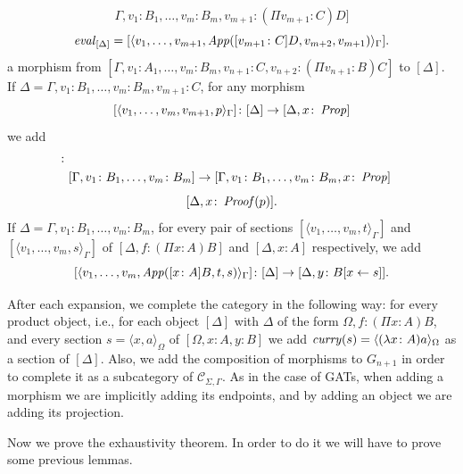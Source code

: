 \begin{enumerate}
\[                \Gamma,
                v_1 \colon B_1, \dots, v_m \colon B_m,
                v_{m+1} \colon (\Pi v_{m+1} \colon C) D
            ]
        \]
        \[
            \operatorname{\mathit{eval}}_{[\Delta]} = [ \langle
                v_1, \dots, v_{m+1},
                \operatorname{\mathit{App}}([v_{m+1} \colon C]D, v_{m+2}, v_{m+1})
            \rangle_\Gamma].
        \]
        a morphism from $[\Gamma, v_1 \colon A_1, \dots, v_m \colon B_m, v_{n+1} \colon C, v_{n+2} \colon (\Pi v_{n+1} \colon B)C ]$
        to $[\Delta]$.
        If $\Delta = \Gamma, v_1 \colon B_1, \dots, v_m \colon B_m, v_{m+1} \colon C$,
        for any morphism $$[\langle v_1, \dots, v_m, v_{m+1}, p \rangle_\Gamma] \colon [\Delta] \to [ \Delta, x \colon \operatorname{\mathit{Prop}}]$$
        we add \begin{align*}
            [ \langle v_1, \dots, v_m, &(\forall \colon v_{m+1} C)p \rangle_\Gamma] \colon \\ 
            &[\Gamma, v_1 \colon B_1, \dots, v_m \colon B_m]
            \to [ \Gamma, v_1 \colon B_1, \dots, v_m \colon B_m, x \colon \Prop]
        \end{align*}
        \[
            [\Delta, x \colon \operatorname{\mathit{Proof}}(p)].
        \]
        If $\Delta = \Gamma, v_1 \colon B_1, \dots, v_m \colon B_m$, 
        for every pair of sections $[\langle v_1, \dots, v_m, t \rangle_\Gamma]$ and \\ %
        $[\langle v_1, \dots, v_m, s \rangle_\Gamma]$
        of $[\Delta, f \colon (\Pi x \colon A) B]$ and $[\Delta, x \colon A]$ respectively,
        we add \[
            [\langle v_1, \dots, v_m, \operatorname{\mathit{App}}([x \colon A] B, t, s)\rangle_\Gamma]
            \colon [\Delta] \to [\Delta, y \colon B[x  \leftarrow  s]].
        \]
\end{enumerate}
After each expansion, we complete the category in the following way:
for every product object, i.e., for each object $[\Delta]$ with $\Delta$
of the form $\Omega, f \colon (\Pi x \colon A) B$, and every section 
$s = \langle x, a \rangle_\Omega$ of $[\Omega, x \colon A, y \colon B]$
we add $\operatorname{\mathit{curry}}(s) = \langle (\lambda x \colon A) a \rangle_\Omega$
as a section of $[\Delta]$.
Also, we add the composition of morphisms to $G_{n+1}$ in order to complete it as a subcategory of $\mathcal{C}_{\Sigma, \Gamma}$.
As in the case of GATs, when adding a morphism we are implicitly adding its endpoints, and by adding an object we are adding its projection.

Now we prove the exhaustivity theorem. In order to do it we will have to prove some previous lemmas.

